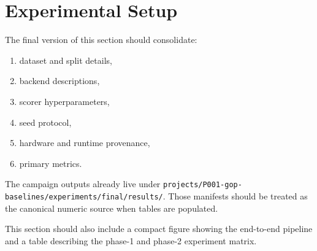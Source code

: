 \section{Experimental Setup}

The final version of this section should consolidate:

\begin{enumerate}
  \item dataset and split details,
  \item backend descriptions,
  \item scorer hyperparameters,
  \item seed protocol,
  \item hardware and runtime provenance,
  \item primary metrics.
\end{enumerate}

The campaign outputs already live under
\texttt{projects/P001-gop-baselines/experiments/final/results/}. Those manifests
should be treated as the canonical numeric source when tables are populated.

This section should also include a compact figure showing the end-to-end
pipeline and a table describing the phase-1 and phase-2 experiment matrix.
